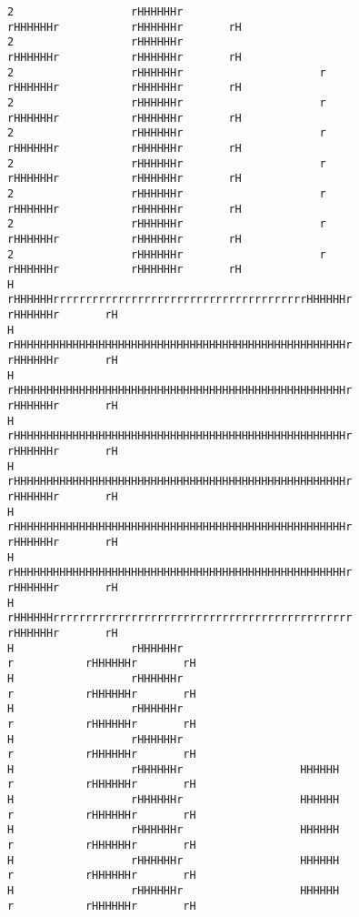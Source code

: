 \documentclass[10pt,a4paper]{article}
\begin{document}
{\begin{verbatim}
2                  rHHHHHHr                                     rHHHHHHr           rHHHHHHr       rH
2                  rHHHHHHr                                     rHHHHHHr           rHHHHHHr       rH
2                  rHHHHHHr                     r               rHHHHHHr           rHHHHHHr       rH
2                  rHHHHHHr                     r               rHHHHHHr           rHHHHHHr       rH
2                  rHHHHHHr                     r               rHHHHHHr           rHHHHHHr       rH
2                  rHHHHHHr                     r               rHHHHHHr           rHHHHHHr       rH
2                  rHHHHHHr                     r               rHHHHHHr           rHHHHHHr       rH
2                  rHHHHHHr                     r               rHHHHHHr           rHHHHHHr       rH
2                  rHHHHHHr                     r               rHHHHHHr           rHHHHHHr       rH
H                  rHHHHHHrrrrrrrrrrrrrrrrrrrrrrrrrrrrrrrrrrrrrrrHHHHHHr           rHHHHHHr       rH
H                  rHHHHHHHHHHHHHHHHHHHHHHHHHHHHHHHHHHHHHHHHHHHHHHHHHHHr           rHHHHHHr       rH
H                  rHHHHHHHHHHHHHHHHHHHHHHHHHHHHHHHHHHHHHHHHHHHHHHHHHHHr           rHHHHHHr       rH
H                  rHHHHHHHHHHHHHHHHHHHHHHHHHHHHHHHHHHHHHHHHHHHHHHHHHHHr           rHHHHHHr       rH
H                  rHHHHHHHHHHHHHHHHHHHHHHHHHHHHHHHHHHHHHHHHHHHHHHHHHHHr           rHHHHHHr       rH
H                  rHHHHHHHHHHHHHHHHHHHHHHHHHHHHHHHHHHHHHHHHHHHHHHHHHHHr           rHHHHHHr       rH
H                  rHHHHHHHHHHHHHHHHHHHHHHHHHHHHHHHHHHHHHHHHHHHHHHHHHHHr           rHHHHHHr       rH
H                  rHHHHHHrrrrrrrrrrrrrrrrrrrrrrrrrrrrrrrrrrrrrrrrrrrrrr           rHHHHHHr       rH
H                  rHHHHHHr                                            r           rHHHHHHr       rH
H                  rHHHHHHr                                            r           rHHHHHHr       rH
H                  rHHHHHHr                                            r           rHHHHHHr       rH
H                  rHHHHHHr                                            r           rHHHHHHr       rH
H                  rHHHHHHr                  HHHHHH                    r           rHHHHHHr       rH
H                  rHHHHHHr                  HHHHHH                    r           rHHHHHHr       rH
H                  rHHHHHHr                  HHHHHH                    r           rHHHHHHr       rH
H                  rHHHHHHr                  HHHHHH                    r           rHHHHHHr       rH
H                  rHHHHHHr                  HHHHHH                    r           rHHHHHHr       rH

\end{verbatim}}
\end{document}
